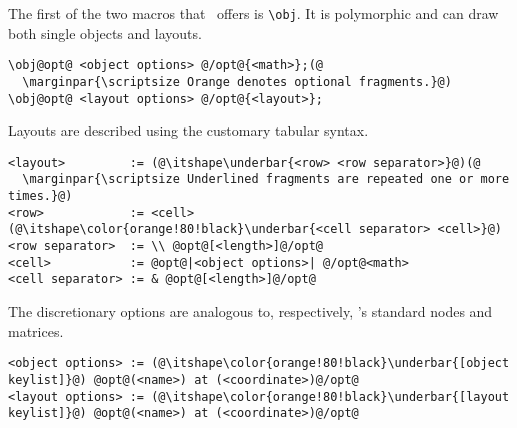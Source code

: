 The first of the two macros that \koDi\ offers is \lstinline|\obj|.
It is polymorphic and can draw both single objects and layouts.

\begin{lstlisting}
\obj@opt@ <object options> @/opt@{<math>};(@
  \marginpar{\scriptsize Orange denotes optional fragments.}@)
\obj@opt@ <layout options> @/opt@{<layout>};
\end{lstlisting}

Layouts are described using the customary tabular syntax.

\begin{lstlisting}
<layout>         := (@\itshape\underbar{<row> <row separator>}@)(@
  \marginpar{\scriptsize Underlined fragments are repeated one or more times.}@)
<row>            := <cell> (@\itshape\color{orange!80!black}\underbar{<cell separator> <cell>}@)
<row separator>  := \\ @opt@[<length>]@/opt@
<cell>           := @opt@|<object options>| @/opt@<math>
<cell separator> := & @opt@[<length>]@/opt@
\end{lstlisting}

The discretionary options are analogous to, respectively,
\TikZ's standard nodes and matrices.

\begin{lstlisting}
<object options> := (@\itshape\color{orange!80!black}\underbar{[object keylist]}@) @opt@(<name>) at (<coordinate>)@/opt@
<layout options> := (@\itshape\color{orange!80!black}\underbar{[layout keylist]}@) @opt@(<name>) at (<coordinate>)@/opt@
\end{lstlisting}


